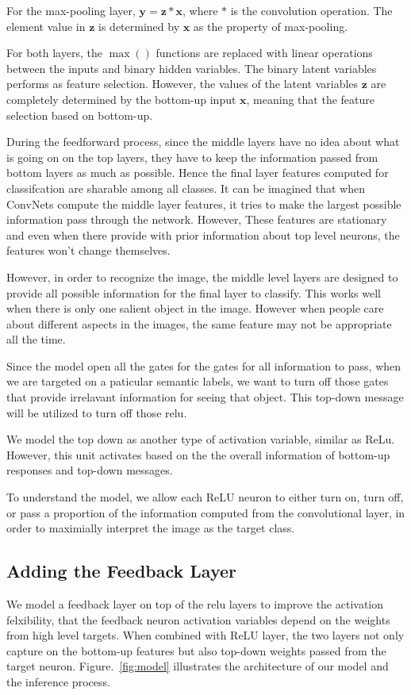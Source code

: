 For the max-pooling layer, $\mathbf{y} = \mathbf{z} * \mathbf{x}$, where $*$ is the convolution operation. The element value in $\mathbf{z}$ is determined by $\mathbf{x}$ as the property of max-pooling.

For both layers, the $\max()$ functions are replaced with linear operations between the inputs and binary hidden variables. The binary latent variables performs as feature selection. However, the values of the latent variables $\mathbf{z}$ are completely determined by the bottom-up input $\mathbf{x}$, meaning that the feature selection based on bottom-up. 

During the feedforward process, since the middle layers have no idea about what is going on on the top layers, they have to keep the information passed from bottom layers as much as possible. Hence the final layer features computed for classifcation are sharable among all classes. It can be imagined that when ConvNets compute the middle layer features, it tries to make the largest possible information pass through the network. However, These features are stationary and even when there provide with prior information about top level neurons, the features won't change themselves.

However, in order to recognize the image, the middle level layers are designed to provide all possible information for the final layer to classify. This works well when there is only one salient object in the image. However when people care about different aspects in the images, the same feature may not be appropriate all the time. 

Since the model open all the gates for the gates for all information to pass, when we are targeted on a paticular semantic labels, we want to turn off those gates that provide irrelavant information for seeing that object. This top-down message will be utilized to turn off those relu.

We model the top down as another type of activation variable, similar as ReLu. However, this unit activates based on the the overall information of bottom-up responses and top-down messages. 

To understand the model, we allow each ReLU neuron to either turn on, turn off, or pass a proportion of the information computed from the convolutional layer, in order to maximially interpret the image as the target class.

\subsection{Adding the Feedback Layer}
We model a feedback layer on top of the relu layers to improve the activation felxibility, that the feedback neuron activation variables depend on the weights from high level targets. When combined with ReLU layer, the two layers not only capture on the bottom-up features but also top-down weights passed from the target neuron. Figure.~\ref{fig:model} illustrates the architecture of our model and the inference process. 

